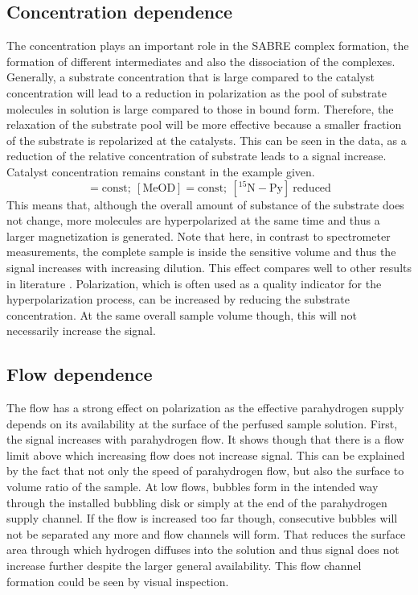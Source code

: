         \subsection{Concentration dependence}
            The concentration plays an important role in the SABRE complex formation, the formation of different intermediates and also the dissociation of the complexes. Generally, a substrate concentration that is large compared to the catalyst concentration will lead to a reduction in polarization as the pool of substrate molecules in solution is large compared to those in bound form. Therefore, the relaxation of the substrate pool will be more effective because a smaller fraction of the substrate is repolarized at the catalysts. This can be seen in the data, as a reduction of the relative concentration of substrate leads to a signal increase. Catalyst concentration remains constant in the example given.
            \begin{equation*}
                [\mathrm{IrIMes}] = \mathrm{const};~[\mathrm{MeOD}] = \mathrm{const};~[\mathrm{^{15}N-Py}]~\mathrm{reduced}
            \end{equation*}
            This means that, although the overall amount of substance of the substrate does not change, more molecules are hyperpolarized at the same time and thus a larger magnetization is generated. Note that here, in contrast to spectrometer measurements, the complete sample is inside the sensitive volume and thus the signal increases with increasing dilution. This effect compares well to other results in literature \cite{barskiy_simple_2015}. Polarization, which is often used as a quality indicator for the hyperpolarization process, can be increased by reducing the substrate concentration. At the same overall sample volume though, this will not necessarily increase the signal.
        \subsection{Flow dependence}
        The flow has a strong effect on polarization as the effective parahydrogen supply depends on its availability at the surface of the perfused sample solution. First, the signal increases with parahydrogen flow. It shows though that there is a flow limit above which increasing flow does not increase signal. This can be explained by the fact that not only the speed of parahydrogen flow, but also the surface to volume ratio of the sample. At low flows, bubbles form in the intended way through the installed bubbling disk or simply at the end of the parahydrogen supply channel. If the flow is increased too far though, consecutive bubbles will not be separated any more and flow channels will form. That reduces the surface area through which hydrogen diffuses into the solution and thus signal does not increase further despite the larger general availability. This flow channel formation could be seen by visual inspection.
